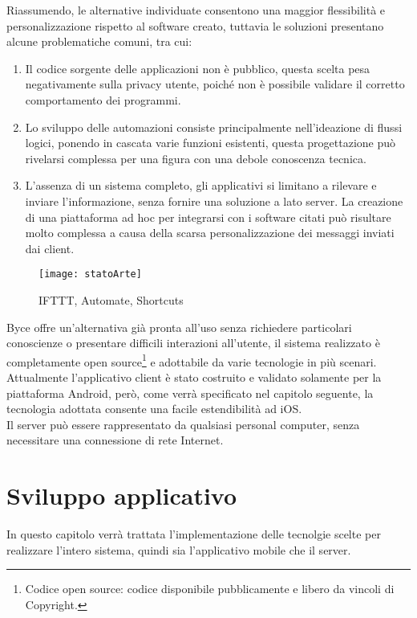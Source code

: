 \documentclass[target=bach]{thud}
\begin{document}
    Riassumendo, le alternative individuate consentono una maggior flessibilità e personalizzazione rispetto al software creato, tuttavia le soluzioni presentano alcune problematiche comuni, tra cui:

    \begin{enumerate}
        \item Il codice sorgente delle applicazioni non è pubblico, questa scelta pesa negativamente sulla privacy utente, poiché non è possibile validare il corretto comportamento dei programmi.
        \item Lo sviluppo delle automazioni consiste principalmente nell'ideazione di flussi logici, ponendo in cascata varie funzioni esistenti, questa progettazione può rivelarsi complessa per una figura con una debole conoscenza tecnica.
        \item L'assenza di un sistema completo, gli applicativi si limitano a rilevare e inviare l'informazione, senza fornire una soluzione a lato server. La creazione di una piattaforma ad hoc per integrarsi con i software citati può risultare molto complessa a causa della scarsa personalizzazione dei messaggi inviati dai client.
    \end{enumerate}


    \graphicspath{ {./img/} }
    \begin{figure}[h]
        \centering
        \texttt{[image: statoArte]}
        \caption{IFTTT, Automate, Shortcuts}
        \label{fig:usecase}
    \end{figure}

    Byce offre un'alternativa già pronta all'uso senza richiedere particolari conoscienze o presentare difficili interazioni all'utente, il sistema realizzato è completamente open source\footnote[6]{Codice open source: codice disponibile pubblicamente e libero da vincoli di Copyright.} e adottabile da varie tecnologie in più scenari.
    Attualmente l'applicativo client è stato costruito e validato solamente per la piattaforma Android, però, come verrà specificato nel capitolo seguente, la tecnologia adottata consente una facile estendibilità ad iOS.\\
    Il server può essere rappresentato da qualsiasi personal computer, senza necessitare una connessione di rete Internet.\\


\chapter{Sviluppo applicativo}
    In questo capitolo verrà trattata l'implementazione delle tecnolgie scelte per realizzare l'intero sistema, quindi sia l'applicativo mobile che il server.
\end{document}
